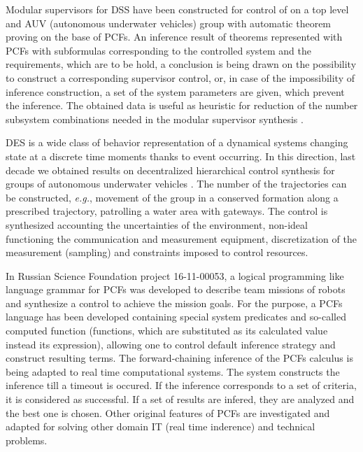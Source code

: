 \documentclass[conference,a4paper]{IEEEtran}
\begin{document}
Modular supervisors for DSS have been constructed for control of on a top level and AUV (autonomous underwater vehicles) group with automatic theorem proving on the base of PCFs. An inference result of theorems represented with PCFs with subformulas corresponding to the controlled system and the requirements, which are to be hold, a conclusion is being drawn on the possibility to construct a corresponding supervisor control, or, in case of the impossibility of inference construction, a set of the system parameters are given, which prevent the inference. The obtained data is useful as heuristic for reduction of the number subsystem combinations needed in the modular supervisor synthesis \cite{supdes,langdes}.

DES is a wide class of behavior representation of a dynamical systems changing state at a discrete time moments thanks to event occurring. In this direction, last decade we obtained results on decentralized hierarchical control synthesis for groups of autonomous underwater vehicles \cite{b4}. The number of the trajectories can be constructed, \emph{e.g.}, movement of the group in a conserved formation along a prescribed trajectory, patrolling a water area with gateways. The control is synthesized accounting the uncertainties of the environment, non-ideal functioning the communication and measurement equipment, discretization of the measurement (sampling) and constraints imposed to control resources.

In Russian Science Foundation project 16-11-00053, a logical programming like language grammar for PCFs was developed to describe team missions of robots \cite{b5} and synthesize a control to achieve the mission goals. For the purpose, a PCFs language has been developed containing special system predicates and so-called computed function (functions, which are substituted as its calculated value instead its expression), allowing one to control default inference strategy and construct resulting terms. The forward-chaining inference of the PCFs calculus is being adapted to real time computational systems. The system constructs the inference till a timeout is occured.  If the inference corresponds to a set of criteria, it is considered as successful. If a set of results are infered, they are analyzed and the best one is chosen. Other original features of PCFs are investigated and adapted for solving other domain IT (real time inderence) and technical problems.
\end{document}
